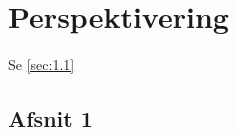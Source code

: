 \chapter{Perspektivering}
\label{Ch:7}

Se \vref{sec:1.1}

\lipsum*

\section{Afsnit 1}
\label{sec:1.1}

\lipsum*
